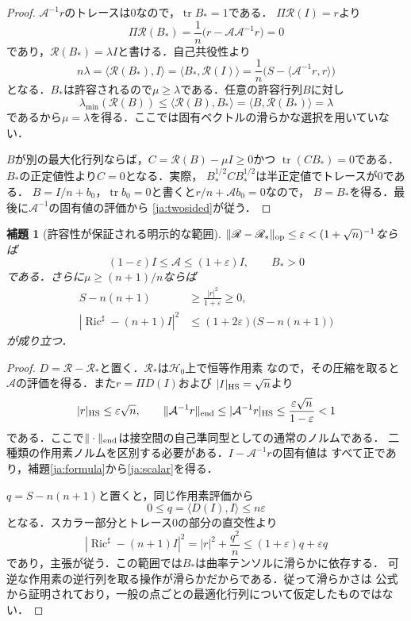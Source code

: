 \documentclass[12pt]{amsart}
\theoremstyle{definition}
\theoremstyle{remark}
\numberwithin{equation}{section}
\DeclareMathOperator{\Ric}{Ric}
\DeclareMathOperator{\tr}{tr}
\theoremstyle{plain}
\newtheorem{jlem}[thm]{補題}
\theoremstyle{remark}
\theoremstyle{definition}
\begin{document}
\begin{proof}
$\mathcal A^{-1}r$のトレースは0なので，$\tr B_*=1$である．
$\Pi\mathscr R(I)=r$より
\[
 \Pi\mathscr R(B_*)=\frac1n\bigl(r-\mathcal A\mathcal A^{-1}r\bigr)=0
\]
であり，$\mathscr R(B_*)=\lambda I$と書ける．自己共役性より
\[
 n\lambda=\langle\mathscr R(B_*),I\rangle
 =\langle B_*,\mathscr R(I)\rangle
 =\frac1n\bigl(S-\langle\mathcal A^{-1}r,r\rangle\bigr)
\]
となる．$B_*$は許容されるので$\mu\geq\lambda$である．任意の許容行列$B$に対し
\[
 \lambda_{\min}(\mathscr R(B))
 \leq\langle\mathscr R(B),B_*\rangle
 =\langle B,\mathscr R(B_*)\rangle=\lambda
\]
であるから$\mu=\lambda$を得る．ここでは固有ベクトルの滑らかな選択を用いていない．

$B$が別の最大化行列ならば，$C=\mathscr R(B)-\mu I\geq0$かつ
$\tr(CB_*)=0$である．$B_*$の正定値性より$C=0$となる．実際，
$B_*^{1/2}CB_*^{1/2}$は半正定値でトレースが0である．
$B=I/n+b_0$，$\tr b_0=0$と書くと$r/n+\mathcal A b_0=0$なので，
$B=B_*$を得る．最後に$\mathcal A^{-1}$の固有値の評価から
\eqref{ja:twosided}が従う．
\end{proof}

\begin{jlem}[許容性が保証される明示的な範囲]\label{ja:pinch}
$\|\mathscr R-\mathscr R_*\|_{\rm op}\leq\varepsilon<
(1+\sqrt n)^{-1}$ならば
\[
 (1-\varepsilon)I\leq\mathcal A\leq(1+\varepsilon)I,
 \qquad B_*>0
\]
である．さらに$\mu\geq(n+1)/n$ならば
\begin{align}
 S-n(n+1)&\geq\frac{|r|^2}{1+\varepsilon}\geq0,\label{ja:scalar}\\
 |\Ric^\sharp-(n+1)I|^2
 &\leq(1+2\varepsilon)\bigl(S-n(n+1)\bigr)\label{ja:pointwiseE}
\end{align}
が成り立つ．
\end{jlem}

\begin{proof}
$D=\mathscr R-\mathscr R_*$と置く．$\mathscr R_*$は$\mathcal H_0$上で恒等作用素
なので，その圧縮を取ると$\mathcal A$の評価を得る．また$r=\Pi D(I)$および
$|I|_{\rm HS}=\sqrt n$より
\[
 |r|_{\rm HS}\leq\varepsilon\sqrt n,
 \qquad \|\mathcal A^{-1}r\|_{\rm end}
 \leq|\mathcal A^{-1}r|_{\rm HS}
 \leq\frac{\varepsilon\sqrt n}{1-\varepsilon}<1
\]
である．ここで$\|\cdot\|_{\rm end}$は接空間の自己準同型としての通常のノルムである．
二種類の作用素ノルムを区別する必要がある．$I-\mathcal A^{-1}r$の固有値は
すべて正であり，補題\ref{ja:formula}から\eqref{ja:scalar}を得る．

$q=S-n(n+1)$と置くと，同じ作用素評価から
\[
 0\leq q=\langle D(I),I\rangle\leq n\varepsilon
\]
となる．スカラー部分とトレース0の部分の直交性より
\[
 |\Ric^\sharp-(n+1)I|^2=|r|^2+\frac{q^2}{n}
 \leq(1+\varepsilon)q+\varepsilon q
\]
であり，主張が従う．この範囲では$B_*$は曲率テンソルに滑らかに依存する．
可逆な作用素の逆行列を取る操作が滑らかだからである．従って滑らかさは
公式から証明されており，一般の点ごとの最適化行列について仮定したものではない．
\end{proof}
\end{document}
